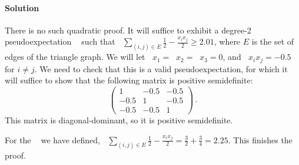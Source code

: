 \documentclass[11pt]{article}
\theoremstyle{definition}
\DeclareMathOperator{\pE}{\widetilde{\mathbb{E}}} %
\begin{document}
\paragraph{Solution}
There is no such quadratic proof.
It will suffice to exhibit a degree-2 pseudoexpectation $\pE$ such that $\pE \sum_{(i,j) \in E} \frac 12 - \frac{x_i x_j}{2} \geq 2.01$, where $E$ is the set of edges of the triangle graph.
We will let $\pE x_1 = \pE x_2 = \pE x_3 = 0$, and $\pE x_i x_j = -0.5$ for $i \neq j$.
We need to check that this is a valid pseudoexpectation, for which it will suffice to show that the following matrix is positive semidefinite:
\[
  \left ( \begin{matrix} 1 & -0.5 & -0.5 \\ -0.5 & 1 & -0.5 \\ -0.5 & -0.5 & 1 \end{matrix} \right ) \, .
\]
This matrix is diagonal-dominant, so it is positive semidefinite.

For the $\pE$ we have defined, $\pE \sum_{(i,j) \in E} \frac 12 - \frac{x_i x_j}{2} = \frac 32 + \frac 34 = 2.25$.
This finishes the proof.
\end{document}
